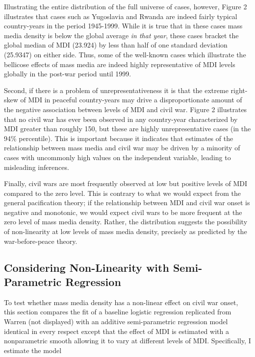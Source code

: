 \documentclass[11pt,article,oneside]{memoir}
\begin{document}
Illustrating the entire distribution of the full universe of cases,
however, Figure 2 illustrates that cases such as Yugoslavia and Rwanda
are indeed fairly typical country-years in the period 1945-1999. While
it is true that in these cases mass media density is below the global
average \emph{in that year}, these cases bracket the global median of
MDI (23.924) by less than half of one standard deviation (25.9347) on
either side. Thus, some of the well-known cases which illustrate the
bellicose effects of mass media are indeed highly representative of MDI
levels globally in the post-war period until 1999.

Second, if there is a problem of unrepresentativeness it is that the
extreme right-skew of MDI in peaceful country-years may drive a
disproportionate amount of the negative association between levels of
MDI and civil war. Figure 2 illustrates that no civil war has ever been
observed in any country-year characterized by MDI greater than roughly
150, but these are highly unrepresentative cases (in the 94\%
percentile). This is important because it indicates that estimates of
the relationship between mass media and civil war may be driven by a
minority of cases with uncommonly high values on the independent
variable, leading to misleading inferences.

Finally, civil wars are most frequently observed at low but positive
levels of MDI compared to the zero level. This is contrary to what we
would expect from the general pacification theory; if the relationship
between MDI and civil war onset is negative and monotonic, we would
expect civil wars to be more frequent at the zero level of mass media
density. Rather, the distribution suggests the possibility of
non-linearity at low levels of mass media density, precisely as
predicted by the war-before-peace theory.

\subsection{Considering Non-Linearity with Semi-Parametric
Regression}\label{considering-non-linearity-with-semi-parametric-regression}

To test whether mass media density has a non-linear effect on civil war
onset, this section compares the fit of a baseline logistic regression
replicated from Warren (not displayed) with an additive semi-parametric
regression model identical in every respect except that the effect of
MDI is estimated with a nonparametric smooth allowing it to vary at
different levels of MDI. Specifically, I estimate the model
\end{document}

